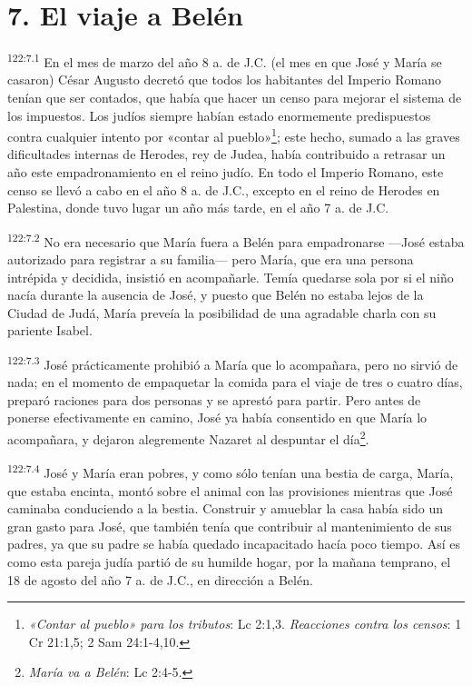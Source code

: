 \section*{7. El viaje a Belén}
\par 
\textsuperscript{122:7.1} En el mes de marzo del año 8 a. de J.C. (el mes en que José y María se casaron) César Augusto decretó que todos los habitantes del Imperio Romano tenían que ser contados, que había que hacer un censo para mejorar el sistema de los impuestos. Los judíos siempre habían estado enormemente predispuestos contra cualquier intento por «contar al pueblo»\footnote{\textit{«Contar al pueblo» para los tributos}: Lc 2:1,3. \textit{Reacciones contra los censos}: 1 Cr 21:1,5; 2 Sam 24:1-4,10.}; este hecho, sumado a las graves dificultades internas de Herodes, rey de Judea, había contribuido a retrasar un año este empadronamiento en el reino judío. En todo el Imperio Romano, este censo se llevó a cabo en el año 8 a. de J.C., excepto en el reino de Herodes en Palestina, donde tuvo lugar un año más tarde, en el año 7 a. de J.C.

\par 
\textsuperscript{122:7.2} No era necesario que María fuera a Belén para empadronarse ---José estaba autorizado para registrar a su familia--- pero María, que era una persona intrépida y decidida, insistió en acompañarle. Temía quedarse sola por si el niño nacía durante la ausencia de José, y puesto que Belén no estaba lejos de la Ciudad de Judá, María preveía la posibilidad de una agradable charla con su pariente Isabel.

\par 
\textsuperscript{122:7.3} José prácticamente prohibió a María que lo acompañara, pero no sirvió de nada; en el momento de empaquetar la comida para el viaje de tres o cuatro días, preparó raciones para dos personas y se aprestó para partir. Pero antes de ponerse efectivamente en camino, José ya había consentido en que María lo acompañara, y dejaron alegremente Nazaret al despuntar el día\footnote{\textit{María va a Belén}: Lc 2:4-5.}.

\par 
\textsuperscript{122:7.4} José y María eran pobres, y como sólo tenían una bestia de carga, María, que estaba encinta, montó sobre el animal con las provisiones mientras que José caminaba conduciendo a la bestia. Construir y amueblar la casa había sido un gran gasto para José, que también tenía que contribuir al mantenimiento de sus padres, ya que su padre se había quedado incapacitado hacía poco tiempo. Así es como esta pareja judía partió de su humilde hogar, por la mañana temprano, el 18 de agosto del año 7 a. de J.C., en dirección a Belén.


